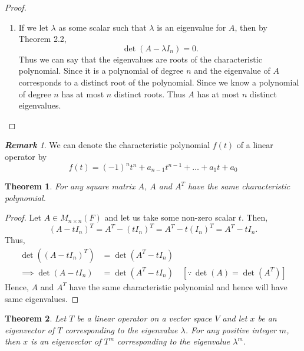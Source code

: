 \documentclass[12pt, a4paper]{article}
\newtheorem{theorem}{Theorem}[section]
\theoremstyle{definition}
\theoremstyle{remark}
\newtheorem*{remark}{\textbf{Remark}}
\begin{document}
\begin{proof}
\begin{enumerate}
    Here every term except $(-1)^n t^n$ is a polynomial of degree at most $n-1$. Thus,
    \[
    \det(B) = (-1)^n t^n + r(t)
    \]
    where $\deg(r(t)) \le n-1$. Thus $f(t)$ is a polynomial of degree $n$ with leading coefficient $(-1)^n$. Hence the theorem holds true for all $n \times n$ matrices.

    \item If we let $\lambda$ as some scalar such that $\lambda$ is an eigenvalue for $A$, then by Theorem 2.2,
    \[
    \det(A - \lambda I_n) = 0.
    \]
    Thus we can say that the eigenvalues are roots of the characteristic polynomial. Since it is a polynomial of degree $n$ and the eigenvalue of $A$ corresponds to a distinct root of the polynomial. Since we know a polynomial of degree $n$ has at most $n$ distinct roots. Thus $A$ has at most $n$ distinct eigenvalues.
\end{enumerate}
\end{proof}

\begin{remark}
    We can denote the characteristic polynomial $f(t)$ of a linear  operator by
    \[
    f(t)=(-1)^nt^n + a_{n-1}t^{n-1}+\ldots + a_1t+a_0
    \]
\end{remark}

\begin{theorem}
For any square matrix $A$, $A$ and $A^T$ have the same characteristic polynomial.
\end{theorem}

\begin{proof}
Let $A \in M_{n \times n}(F)$ and let us take some non-zero scalar $t$. Then,
\[
(A - t I_n)^T = A^T - (t I_n)^T = A^T - t (I_n)^T = A^T - t I_n.
\]
Thus,
\begin{align*}
\det\left((A - t I_n)^T\right) &= \det(A^T - t I_n) \\
\implies \det(A - t I_n) &= \det(A^T - t I_n) \quad [\because \, \det(A)=\det(A^T)]
\end{align*}
Hence, $A$ and $A^T$ have the same characteristic polynomial and hence will have same eigenvalues.
\end{proof}

\begin{theorem}
Let $T$ be a linear operator on a vector space $V$ and let $x$ be an eigenvector of $T$ corresponding to the eigenvalue $\lambda$. For any positive integer $m$, then $x$ is an eigenvector of $T^m$ corresponding to the eigenvalue $\lambda^m$.
\end{theorem}
\end{document}
